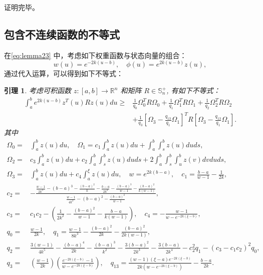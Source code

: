 \documentclass[a4paper, 12pt, oneside]{article}
\theoremstyle{cn_theorem}
\newtheorem{lemma}{引理}[section]   %
\begin{document}
证明完毕。

\subsection{包含不连续函数的不等式}
在\eqref{eq:lemma23} 中，考虑如下权重函数与状态向量的组合：
\begin{equation*}
    w(u) = e^{-2k(u-b)}, \quad \phi(u) = e^{2k(u-b)} z(u),
\end{equation*}
通过代入运算，可以得到如下不等式：

\begin{lemma} \label{lemma:ori_2_4}
考虑可积函数 $z: [a,b] \to \mathbb{R}^n$ 和矩阵 $R \in \mathbb{S}_n^+$, 有如下不等式：
\begin{align} \label{eq:lemma24}
    \int_a^b e^{2k(u-b)} z^T(u) R z(u) du \ge & \frac{1}{q_0} \Omega_0^T R \Omega_0 + \frac{1}{q_1} \Omega_1^T R \Omega_1 + \frac{1}{q_2} \Omega_2^T R \Omega_2 \nonumber \\
    & + \frac{1}{q_3} \left[ \Omega_3 - \frac{q_{13}}{q_1} \Omega_1 \right]^T R \left[ \Omega_3 - \frac{q_{13}}{q_1} \Omega_1 \right].
\end{align}
其中
\begin{align*}
    \Omega_0 =& \int_a^b z(u) du, \quad \Omega_1 = c_1 \int_a^b z(u) du + \int_a^b \int_s^b z(u) du ds, \\
    \Omega_2 =& c_3 \int_a^b z(u) du + c_2 \int_a^b \int_s^b z(u) du ds + 2 \int_a^b \int_s^b \int_u^b z(v) dv du ds, \\
    \Omega_3 =& \int_a^b z(u) du + c_4 \int_a^\xi z(u) du, \quad w = e^{2k(b-a)}, \quad c_1 = \frac{b-a}{w-1} - \frac{1}{2k}, \\
    c_2 =& - \frac{\displaystyle \frac{w-1}{2k^3} - (b-a)^3 - \frac{(b-a)^2}{k} - \frac{b-a}{2k^2} - \frac{(b-a)^3}{w-1} - \frac{(b-a)^2}{k(w-1)}}{\displaystyle \frac{w-1}{4k^2} - (b-a)^2 - \frac{(b-a)^2}{w-1}}, \\
    c_3 =& c_1 c_2 - \left(\frac{1}{2k^2} - \frac{(b-a)^2}{w-1} - \frac{b-a}{k(w-1)}\right), \quad c_4 = -\frac{w-1}{w - e^{-2k(\xi-b)}}, \\
    q_0 =& \frac{w-1}{2k}, \quad q_1 = \frac{w-1}{8k^3} - \frac{(b-a)^2}{2k} - \frac{(b-a)^2}{2k(w-1)}, \\
    q_2 =& \frac{3(w-1)}{4k^5} - \frac{(b-a)^4}{2k} - \frac{(b-a)^3}{k^2} - \frac{3(b-a)^2}{2k^3} - \frac{3(b-a)}{2k^4} - c_2^2 q_1 - (c_3 - c_1 c_2)^2 q_0, \\
    q_3 =& \left(\frac{w-1}{2k}\right) \left(\frac{e^{-2k(\xi-b)} - 1}{w - e^{-2k(\xi-b)}}\right), \quad q_{13} = \frac{(w-1)(\xi-a)e^{-2k(\xi-b)}}{2k\left(w - e^{-2k(\xi-b)}\right)} - \frac{b-a}{2k}.
\end{align*}
\end{lemma}
\end{document}
